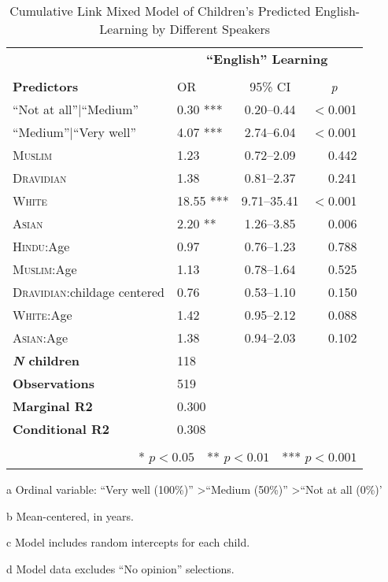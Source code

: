\begin{table*}[t]
\small
\caption{Cumulative Link Mixed Model of Children's Predicted English-Learning by Different Speakers}\label{tab:english-ord}
    \centering
    \vspace{5pt}
\begin{threeparttable}
\begin{tabular}{llcr}
 \toprule
& \multicolumn{3}{c}{\textbf{``English'' Learning}\tnote{a}} \\
\cline{2-4} \\[-.75em]
\textbf{Predictors} & {OR} & {95\% CI} & \multicolumn{1}{c}{\textit{p}} \\ 
\midrule
  \hline
``Not at all''$|$``Medium'' & 0.30 *** & 0.20--0.44 & $<$0.001 \\ 
``Medium''$|$``Very well'' & 4.07 *** & 2.74--6.04 & $<$0.001 \\ 
  \textsc{Muslim} & 1.23 & 0.72--2.09 & 0.442 \\ 
  \textsc{Dravidian} & 1.38 & 0.81--2.37 & 0.241 \\ 
  \textsc{White} & 18.55 *** & 9.71--35.41 & $<$0.001 \\ 
  \textsc{Asian} & 2.20 ** & 1.26--3.85 & 0.006 \\ 
\textsc{Hindu}:Age\tnote{b} & 0.97 & 0.76--1.23 & 0.788 \\ 
  \textsc{Muslim}:Age & 1.13 & 0.78--1.64 & 0.525 \\ 
  \textsc{Dravidian}:childage centered & 0.76 & 0.53--1.10 & 0.150 \\ 
  \textsc{White}:Age & 1.42 & 0.95--2.12 & 0.088 \\ 
  \textsc{Asian}:Age & 1.38 & 0.94--2.03 & 0.102 \\ 
\midrule
\bfseries{\textit{N} children}\tnote{c} & 118 &  &  \\ 
\textbf{Observations}\tnote{d} & 519 &  &  \\ 
 \textbf{Marginal R2} & 0.300 &  &  \\ 
 \textbf{Conditional R2} & 0.308 &&\\
\bottomrule\\[-.75em]
\multicolumn{4}{r}{* $p<0.05$~~** $p<0.01$~~*** $p<0.001$}\\
\end{tabular}
\begin{tablenotes}[flushleft]
    \item[a] Ordinal variable: ``Very well (100\%)'' \textgreater ``Medium (50\%)'' \textgreater ``Not at all (0\%)'
    \item[b] Mean-centered, in years.
    \item[c] Model includes random intercepts for each child.
    \item[d] Model data excludes ``No opinion'' selections. 
\end{tablenotes}
\end{threeparttable}
\end{table*}